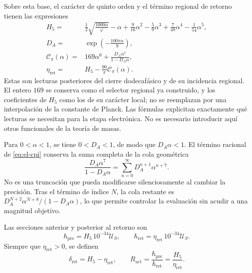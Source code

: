 Sobre esta base, el carácter de quinto orden y el término regional de
retorno tienen las expresiones
\begin{align}
 H_5={}&\frac12\sqrt{\frac{1000\alpha}{\varphi}}-\alpha
   +\frac9{16}\alpha^2-\frac59\alpha^3
   +\frac7{48}\alpha^4-\frac1{54}\alpha^5,
   \label{eq:el-h5}\\
 D_A={}&\exp\!\left(-\frac{100\pi\alpha}{9}\right),
   \label{eq:el-da}\\
 \mathcal C_\pi(\alpha)={}&169\alpha^6+
       \frac{D_A\alpha^7}{1-D_A\alpha},
   \label{eq:el-cpi}\\
 \eta_{\mathrm{ret}}={}&H_5-\frac{90}{\pi}\mathcal C_\pi(\alpha).
   \label{eq:el-eta}
\end{align}
Estas son lecturas posteriores del cierre dodecafásico y de su
incidencia regional. El entero \(169\) se conserva como el selector
regional ya construido, y los coeficientes de \(H_5\) como los de su
carácter local; no se reemplazan por una interpolación de la constante de
Planck. Las fórmulas explicitan exactamente qué lecturas se necesitan
para la etapa electrónica. No es necesario introducir aquí otros
funcionales de la teoría de masas.

Para \(0<\alpha<1\), se tiene \(0<D_A<1\), de modo que
\(D_A\alpha<1\). El término racional de \eqref{eq:el-cpi} conserva la
suma completa de la cola geométrica
\begin{equation}
 \frac{D_A\alpha^7}{1-D_A\alpha}
 =\sum_{n=0}^{\infty}D_A^{n+1}\alpha^{n+7}.
 \label{eq:el-cola-regional}
\end{equation}
No es una truncación que pueda modificarse silenciosamente al cambiar la
precisión. Tras el término de índice \(N\), la cola restante es
\(D_A^{N+2}\alpha^{N+8}/(1-D_A\alpha)\), lo que permite controlar la
evaluación sin acudir a una magnitud objetivo.

\begin{definition}
Las secciones anterior y posterior al retorno son
\begin{equation}
 \hbar_{\mathrm{pre}}=H_5\,10^{-34}\mathcal U_S,
 \qquad
 \hbar_{\mathrm{ret}}=\eta_{\mathrm{ret}}\,10^{-34}\mathcal U_S.
 \label{eq:el-secciones-accion}
\end{equation}
Siempre que \(\eta_{\mathrm{ret}}>0\), se definen
\begin{equation}
 \delta_{\mathrm{ret}}=H_5-\eta_{\mathrm{ret}},\qquad
 R_{\mathrm{act}}=\frac{\hbar_{\mathrm{pre}}}{\hbar_{\mathrm{ret}}}
 =\frac{H_5}{\eta_{\mathrm{ret}}}.
 \label{eq:el-ratio}
\end{equation}
\end{definition}


